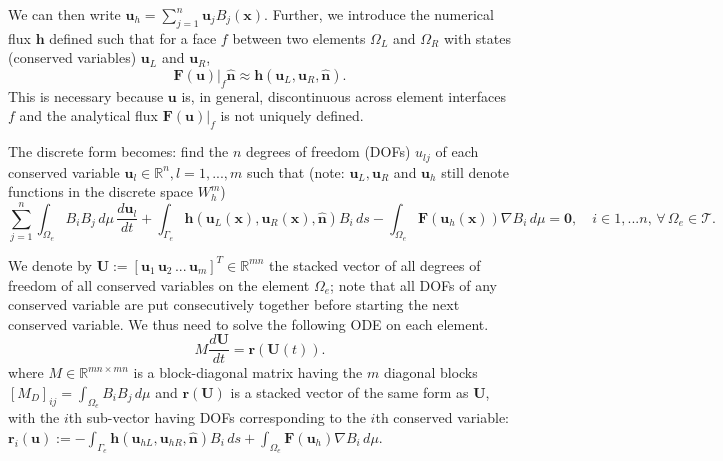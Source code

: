 \documentclass[11pt]{article}
\let\bld\boldsymbol
\begin{document}
We can then write $\bld{u}_h = \sum_{j=1}^n \bld{u}_j B_j(\bld{x})$. Further, we introduce the numerical flux $\bld{h}$ defined such that for a face $f$ between two elements $\Omega_L$ and $\Omega_R$ with states (conserved variables) $\bld{u}_L$ and $ \bld{u}_R$,
\begin{equation}
\bld{F}(\bld{u})|_f\hat{\bld{n}} \approx \bld{h}(\bld{u}_L, \bld{u}_R, \hat{\bld{n}}).
\end{equation}
This is necessary because $\bld{u}$ is, in general, discontinuous across element interfaces $f$ and the analytical flux $\bld{F}(\bld{u})|_f$ is not uniquely defined.

The discrete form becomes: find the $n$ degrees of freedom (DOFs) $u_{lj}$ of each conserved variable $\bld{u}_l \in \mathbb{R}^n, l=1,...,m$ such that (note: $\bld{u}_L, \bld{u}_R$ and $\bld{u}_h$ still denote functions in the discrete space $W_h^m$)
\begin{equation}
\sum_{j=1}^n\int_{\Omega_e} B_iB_j\,d\mu\, \frac{d\bld{u}_{l}}{d t} + \int_{\Gamma_e}  \bld{h}(\bld{u}_L(\bld{x}), \bld{u}_R(\bld{x}), \hat{\bld{n}})B_i \,ds - \int_{\Omega_e}\bld{F}(\bld{u}_h(\bld{x}))\nabla B_i \,d\mu = \bld{0}, \quad i \in {1,...n},\, \forall \,\Omega_e \in \mathcal{T}.
\label{df}
\end{equation}

We denote by $\bld{U} := [\bld{u}_1\, \bld{u}_2\, ...\, \bld{u}_m]^T \in \mathbb{R}^{mn}$ the stacked vector of all degrees of freedom of all conserved variables on the element $\Omega_e$; note that all DOFs of any conserved variable are put consecutively together before starting the next conserved variable. We thus need to solve the following ODE on each element.
\begin{equation}
M \frac{d\bld{U}}{dt} = \bld{r}(\bld{U}(t)).
\label{ode}
\end{equation}
where $M \in \mathbb{R}^{mn\times mn}$ is a block-diagonal matrix having the $m$ diagonal blocks $[M_D]_{ij} = \int_{\Omega_e} B_iB_j\,d\mu$ and $\bld{r}(\bld{U})$ is a stacked vector of the same form as $\bld{U}$, with the $i$th sub-vector having DOFs corresponding to the $i$th conserved variable: $\bld{r}_i(\bld{u}) :=  - \int_{\Gamma_e}  \bld{h}(\bld{u}_{hL}, \bld{u}_{hR}, \hat{\bld{n}})B_i \,ds + \int_{\Omega_e}\bld{F}(\bld{u}_h)\nabla B_i \,d\mu$.
\end{document}
